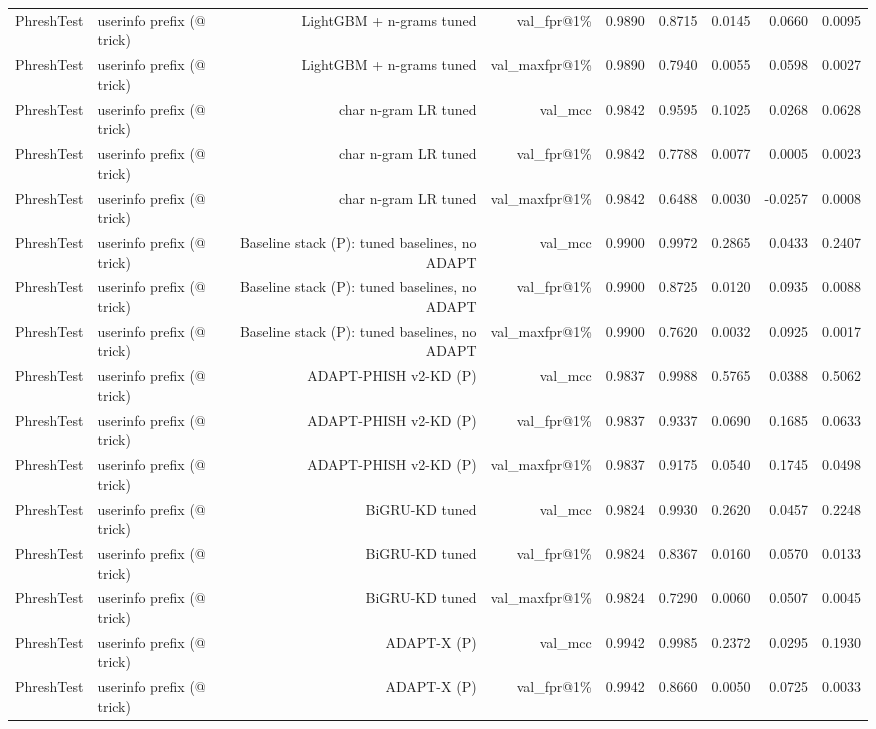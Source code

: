\begin{table}[t]
\begin{tabular}{llrrrrrrr}
PhreshTest & userinfo prefix (@ trick) & LightGBM + n-grams tuned & val\_fpr@1\% & 0.9890 & 0.8715 & 0.0145 & 0.0660 & 0.0095 \\
PhreshTest & userinfo prefix (@ trick) & LightGBM + n-grams tuned & val\_maxfpr@1\% & 0.9890 & 0.7940 & 0.0055 & 0.0598 & 0.0027 \\
PhreshTest & userinfo prefix (@ trick) & char n-gram LR tuned & val\_mcc & 0.9842 & 0.9595 & 0.1025 & 0.0268 & 0.0628 \\
PhreshTest & userinfo prefix (@ trick) & char n-gram LR tuned & val\_fpr@1\% & 0.9842 & 0.7788 & 0.0077 & 0.0005 & 0.0023 \\
PhreshTest & userinfo prefix (@ trick) & char n-gram LR tuned & val\_maxfpr@1\% & 0.9842 & 0.6488 & 0.0030 & -0.0257 & 0.0008 \\
PhreshTest & userinfo prefix (@ trick) & Baseline stack (P): tuned baselines, no ADAPT & val\_mcc & 0.9900 & 0.9972 & 0.2865 & 0.0433 & 0.2407 \\
PhreshTest & userinfo prefix (@ trick) & Baseline stack (P): tuned baselines, no ADAPT & val\_fpr@1\% & 0.9900 & 0.8725 & 0.0120 & 0.0935 & 0.0088 \\
PhreshTest & userinfo prefix (@ trick) & Baseline stack (P): tuned baselines, no ADAPT & val\_maxfpr@1\% & 0.9900 & 0.7620 & 0.0032 & 0.0925 & 0.0017 \\
PhreshTest & userinfo prefix (@ trick) & ADAPT-PHISH v2-KD (P) & val\_mcc & 0.9837 & 0.9988 & 0.5765 & 0.0388 & 0.5062 \\
PhreshTest & userinfo prefix (@ trick) & ADAPT-PHISH v2-KD (P) & val\_fpr@1\% & 0.9837 & 0.9337 & 0.0690 & 0.1685 & 0.0633 \\
PhreshTest & userinfo prefix (@ trick) & ADAPT-PHISH v2-KD (P) & val\_maxfpr@1\% & 0.9837 & 0.9175 & 0.0540 & 0.1745 & 0.0498 \\
PhreshTest & userinfo prefix (@ trick) & BiGRU-KD tuned & val\_mcc & 0.9824 & 0.9930 & 0.2620 & 0.0457 & 0.2248 \\
PhreshTest & userinfo prefix (@ trick) & BiGRU-KD tuned & val\_fpr@1\% & 0.9824 & 0.8367 & 0.0160 & 0.0570 & 0.0133 \\
PhreshTest & userinfo prefix (@ trick) & BiGRU-KD tuned & val\_maxfpr@1\% & 0.9824 & 0.7290 & 0.0060 & 0.0507 & 0.0045 \\
PhreshTest & userinfo prefix (@ trick) & ADAPT-X (P) & val\_mcc & 0.9942 & 0.9985 & 0.2372 & 0.0295 & 0.1930 \\
PhreshTest & userinfo prefix (@ trick) & ADAPT-X (P) & val\_fpr@1\% & 0.9942 & 0.8660 & 0.0050 & 0.0725 & 0.0033 \\

\end{tabular}
\end{table}
